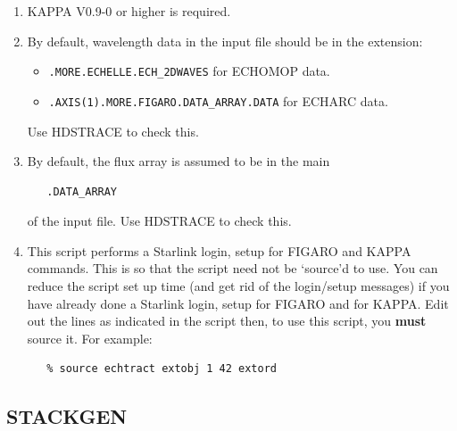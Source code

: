 \documentclass[twoside,11pt]{article}
\newcommand{\stardocinitials}  {SC}
\newcommand{\stardocnumber}    {3.2-0} %
\newcommand{\stardocname}{\stardocinitials /\stardocnumber}
\newcommand{\xref}[3]{#1}
\newcommand{\xlabel}[1]{}
\renewcommand{\_}{\texttt{\symbol{95}}}
\begin{document}
\begin{description}
\begin{enumerate}
\item \xref{KAPPA}{sun95}{} V0.9-0 or higher is required.

\item By default, wavelength data in the input file should be in the
      extension:

\begin{itemize}

\item \verb+.MORE.ECHELLE.ECH_2DWAVES+ for \xref{ECHOMOP}{sun152}{} data.

\item \verb+.AXIS(1).MORE.FIGARO.DATA_ARRAY.DATA+ for
      \xref{ECHARC}{sun86}{ECHARC} data.

\end{itemize}

      Use \xref{HDSTRACE}{sun102}{} to check this.

\item By default, the flux array is assumed to be in the main

\begin{verbatim}
   .DATA_ARRAY
\end{verbatim}

       of the input file.  Use HDSTRACE to check this.

\item This script performs a Starlink login, setup for FIGARO
      and KAPPA commands.  This is so that the script need not be
      `source'd to use.  You can reduce the script set up time (and
      get rid of the login/setup messages) if you have already done a
      Starlink login, setup for FIGARO and for KAPPA.  Edit out the
      lines as indicated in the script then, to use this script, you
      {\bf must} source it.  For example:

\begin{verbatim}
   % source echtract extobj 1 42 extord
\end{verbatim}
\end{enumerate}
\end{description}


\newpage
\subsection{\label{se_stackgen}\xlabel{STACKGEN}STACKGEN}
\markboth{STACKGEN}{\stardocname}
\end{document}

